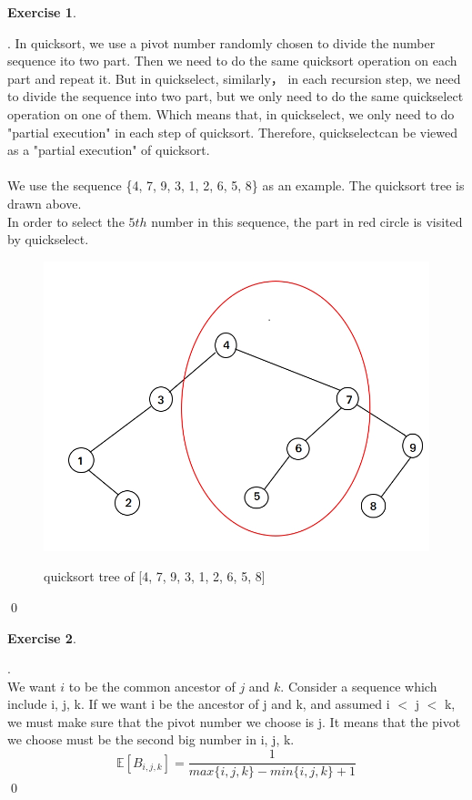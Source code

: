 \documentclass[12pt, notitlepage]{article}
\newtheorem{ex}{Exercise}
\newenvironment{sol}
  {\par\vspace{3mm}\noindent{\it Solution}.}{\qed}
\begin{document}
\begin{ex}\end{ex}
\begin{sol}
In quicksort, we use a pivot number randomly chosen to divide the number sequence ito two part. Then we need to do the same quicksort operation on each part and repeat it. But in quickselect, similarly， in each recursion step, we need to divide the sequence into two part, but we only need to do the same quickselect operation on one of them. Which means that, in quickselect, we only need to do "partial execution" in each step of quicksort. Therefore, quickselectcan be viewed as a "partial execution" of quicksort. \\ \\
We use the sequence \{4, 7, 9, 3, 1, 2, 6, 5, 8\} as an example. The quicksort tree is drawn above.\\
In order to select the $5th$ number in this sequence, the part in red circle is visited by quickselect.
\begin{figure}[H]
	\center
	\includegraphics[width=0.8\linewidth]{p1.jpg}\vspace{-10pt}
	\caption{quicksort tree of [4, 7, 9, 3, 1, 2, 6, 5, 8]} \nonumber\label{fig:quicksort tree}\vspace{-10pt}
\end{figure}
\end{sol}


\begin{ex}\end{ex}

\begin{sol}\\

\qquad We want $i$ to be the common ancestor of $j$ and $k$. Consider a sequence which include i, j, k. If we want i be the ancestor of j and k, and assumed i $<$ j $<$ k, we must make sure that the pivot number we choose is j. It means that the pivot we choose must be the second big number in i, j, k.
\[
\mathbb{E}[B_{i, j, k}] = \frac{1}{max\{i,j,k\}-min\{i,j,k\}+1}
\]
\end{sol}
\end{document}
